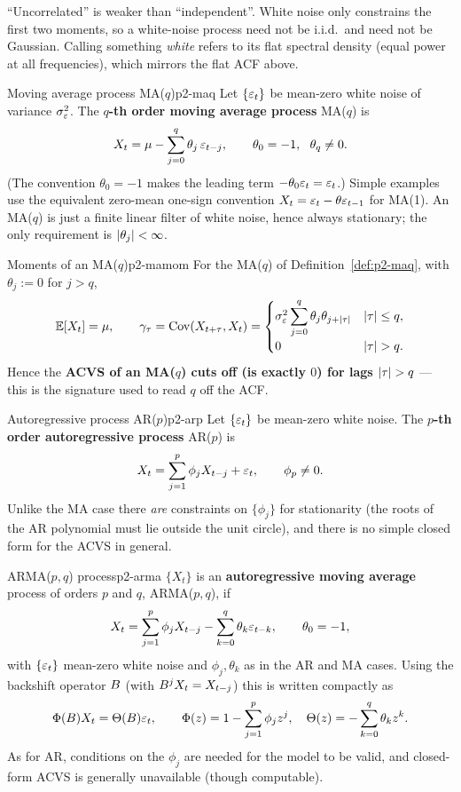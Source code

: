 \begin{intuition}
``Uncorrelated'' is weaker than ``independent''. White noise only constrains the
first two moments, so a white-noise process need not be i.i.d.\ and need not be
Gaussian. Calling something \emph{white} refers to its flat spectral density
(equal power at all frequencies), which mirrors the flat ACF above.
\end{intuition}

\begin{definition}{Moving average process MA($q$)}{p2-maq}
Let $\{\varepsilon_t\}$ be mean-zero white noise of variance $\sigma_\varepsilon^2$. The
\textbf{$q$-th order moving average process} MA($q$) is
\[
X_t=\mu-\sum_{j=0}^{q}\theta_j\,\varepsilon_{t-j},
\qquad \theta_0=-1,\ \ \theta_q\ne0 .
\]
(The convention $\theta_0=-1$ makes the leading term $-\theta_0\varepsilon_t=\varepsilon_t$.)
Simple examples use the equivalent zero-mean one-sign convention
$X_t=\varepsilon_t-\theta\varepsilon_{t-1}$ for MA(1). An MA($q$) is just a finite linear
filter of white noise, hence always stationary; the only requirement is
$\left\lvert \theta_j \right\rvert<\infty$.
\end{definition}

\begin{definition}{Moments of an MA($q$)}{p2-mamom}
For the MA($q$) of Definition~\ref{def:p2-maq}, with $\theta_j:=0$ for $j>q$,
\[
\mathbb{E}[X_t]=\mu,
\qquad
\gamma_\tau=\operatorname{Cov}(X_{t+\tau},X_t)=
\begin{cases}
\sigma^2_\varepsilon\displaystyle\sum_{j=0}^{q}\theta_j\theta_{j+\left\lvert \tau \right\rvert} & \left\lvert \tau \right\rvert\le q,\\[2mm]
0 & \left\lvert \tau \right\rvert>q .
\end{cases}
\]
Hence the \textbf{ACVS of an MA($q$) cuts off (is exactly $0$) for lags
$\left\lvert \tau \right\rvert>q$} --- this is the signature used to read $q$ off the ACF.
\end{definition}

\begin{definition}{Autoregressive process AR($p$)}{p2-arp}
Let $\{\varepsilon_t\}$ be mean-zero white noise. The \textbf{$p$-th order
autoregressive process} AR($p$) is
\[
X_t=\sum_{j=1}^{p}\phi_j X_{t-j}+\varepsilon_t,
\qquad \phi_p\ne0 .
\]
Unlike the MA case there \emph{are} constraints on $\{\phi_j\}$ for stationarity
(the roots of the AR polynomial must lie outside the unit circle), and there is
no simple closed form for the ACVS in general.
\end{definition}

\begin{definition}{ARMA($p,q$) process}{p2-arma}
$\{X_t\}$ is an \textbf{autoregressive moving average} process of orders $p$ and
$q$, ARMA($p,q$), if
\[
X_t=\sum_{j=1}^{p}\phi_j X_{t-j}-\sum_{k=0}^{q}\theta_k\varepsilon_{t-k},
\qquad \theta_0=-1,
\]
with $\{\varepsilon_t\}$ mean-zero white noise and $\phi_j,\theta_k$ as in the AR and MA
cases. Using the backshift operator $B$ (with $B^j X_t=X_{t-j}$) this is
written compactly as
\[
\Phi(B)X_t=\Theta(B)\varepsilon_t,
\qquad
\Phi(z)=1-\sum_{j=1}^{p}\phi_j z^{j},
\quad
\Theta(z)=-\sum_{k=0}^{q}\theta_k z^{k}.
\]
As for AR, conditions on the $\phi_j$ are needed for the model to be valid, and
closed-form ACVS is generally unavailable (though computable).
\end{definition}

